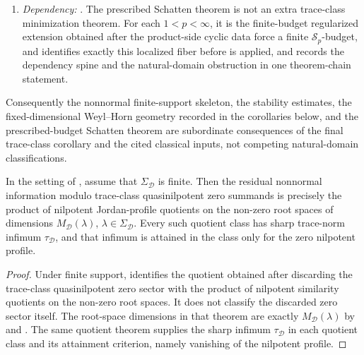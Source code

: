 \begin{remark}
\begin{enumerate}[label=\textup{(\roman*)},leftmargin=1.7em]
    \(M_{\mathcal D}(\lambda)\).
    \item \emph{Dependency:}
    .
The prescribed Schatten theorem is not an extra trace-class
    minimization theorem.  For each \(1<p<\infty\), it is the finite-budget
    regularized extension obtained after the product-side cyclic data force a
    finite \(\mathcal S_p\)-budget, and
     identifies exactly this
    localized fiber before
     is applied, and
     records the dependency
    spine and the natural-domain obstruction in one theorem-chain statement.
  \end{enumerate}
  Consequently the nonnormal finite-support skeleton, the stability estimates,
  the fixed-dimensional Weyl--Horn geometry recorded in the corollaries below,
  and the prescribed-budget Schatten theorem are subordinate consequences of
  the final trace-class corollary and the cited classical inputs, not competing
  natural-domain classifications.
\end{remark}

\begin{corollary}
  \label{cor:trace-rigidity-nonnormal-skeleton-package}
  In the setting of , assume that
  \(\Sigma_{\mathcal D}\) is finite.  Then the residual nonnormal information
  modulo trace-class quasinilpotent zero summands is precisely the product of
  nilpotent Jordan-profile quotients on the non-zero root spaces of dimensions
  \(M_{\mathcal D}(\lambda)\), \(\lambda\in\Sigma_{\mathcal D}\). Every such
  quotient class has sharp trace-norm infimum \(\tau_{\mathcal D}\), and that
  infimum is attained in the class only for the zero nilpotent profile.
\end{corollary}

\begin{proof}
  Under finite support, 
  identifies the quotient obtained after discarding the trace-class
  quasinilpotent zero sector with
  the product of nilpotent similarity quotients on the non-zero root spaces.
  It does not classify the discarded zero sector itself.
  The root-space dimensions in that theorem are exactly
  \(M_{\mathcal D}(\lambda)\) by  and
  . The same quotient theorem
  supplies the sharp infimum \(\tau_{\mathcal D}\) in each quotient class and
  its attainment criterion, namely vanishing of the nilpotent profile.
\end{proof}

